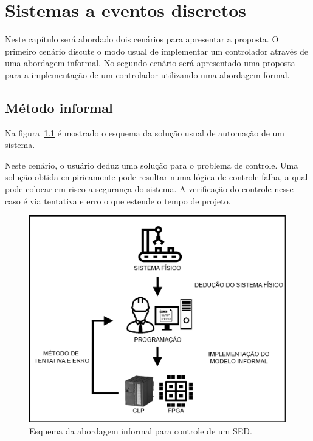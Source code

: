 
\chapter{Sistemas a eventos discretos}

Neste cap\'itulo ser\'a abordado dois cen\'arios para apresentar a proposta. O primeiro cen\'ario discute o modo usual de implementar um controlador atrav\'es de uma abordagem informal. No segundo cen\'ario ser\'a apresentado uma proposta para a implementa\c{c}\~ao de um controlador utilizando uma abordagem formal.

\section{M\'etodo informal}

Na figura~\ref{fig:esquemainformal} \'e mostrado o esquema da solu\c{c}\~ao usual de automa\c{c}\~ao de um sistema.

Neste cen\'ario, o usu\'ario deduz uma solu\c{c}\~ao para o problema de controle. Uma solu\c{c}\~ao obtida empiricamente pode resultar numa l\'ogica de controle falha, a qual pode colocar em risco a seguran\c{c}a do sistema. A verifica\c{c}\~ao do controle nesse caso \'e via tentativa e erro o que estende o tempo de projeto.

\begin{figure}[!htb]
	\caption[Esquema da abordagem informal para controle de um SED]{Esquema da abordagem informal para controle de um SED.}
	\label{fig:esquemainformal}
	\includegraphics[width=16cm]{./figuras/ESQUEMA_MODELAGEM_INFORMAL.png}\centering
\end{figure}

